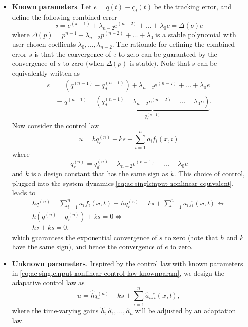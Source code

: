\documentclass[
]{book}
\theoremstyle{definition}
\theoremstyle{definition}
\theoremstyle{definition}
\theoremstyle{definition}
\theoremstyle{remark}
\begin{document}
\begin{itemize}
\item
  \textbf{Known parameters}. Let \(e = q(t) - q_d(t)\) be the tracking error, and define the following combined error
  \[
  s = e^{(n-1)} + \lambda_{n-2} e^{(n-2)} + \dots + \lambda_0 e = \Delta(p) e 
  \]
  where \(\Delta(p) = p^{n-1} + \lambda_{n-2} p^{(n-2)} + \dots + \lambda_0\) is a stable polynomial with user-chosen coeffients \(\lambda_0,\dots,\lambda_{n-2}\). The rationale for defining the combined error \(s\) is that the convergence of \(e\) to zero can be guaranteed by the convergence of \(s\) to zero (when \(\Delta(p)\) is stable).
  Note that \(s\) can be equivalently written as
  \begin{align}
  s & = (q^{(n-1)} - q_d^{(n-1)}) + \lambda_{n-2} e^{(n-2)} + \dots + \lambda_0 e \\
  & = q^{(n-1)} - \underbrace{ \left( q_d^{(n-1)} - \lambda_{n-2} e^{(n-2)} - \dots - \lambda_0 e  \right) }_{q_r^{(n-1)}}.
  \end{align}
  Now consider the control law
  \begin{equation}
  u = h q_r^{(n)} - ks + \sum_{i=1}^n a_i f_i(x,t)
  \label{eq:ac-singleinput-nonlinear-control-law-knownparam}
  \end{equation}
  where
  \[
  q_r^{(n)} = q_d^{(n)} - \lambda_{n-2} e^{(n-1)} - \dots - \lambda_0 \dot{e}
  \]
  and \(k\) is a design constant that has the same sign as \(h\). This choice of control, plugged into the system dynamics \eqref{eq:ac-singleinput-nonlinear-equivalent}, leads to
  \begin{align}
  h q^{(n)} + \sum_{i=1}^n a_i f_i(x,t) = h q_r^{(n)} - ks + \sum_{i=1}^n a_i f_i(x,t) \Longleftrightarrow \\
  h \left( q^{(n)} - q_r^{(n)} \right) + ks = 0 \Longleftrightarrow \\
  h \dot{s} + ks = 0,
  \end{align}
  which guarantees the exponential convergence of \(s\) to zero (note that \(h\) and \(k\) have the same sign), and hence the convergence of \(e\) to zero.
\item
  \textbf{Unknown parameters}. Inspired by the control law with known parameters in \eqref{eq:ac-singleinput-nonlinear-control-law-knownparam}, we design the adapative control law as
  \begin{equation}
  u = \hat{h} q_r^{(n)} - ks + \sum_{i=1}^n \hat{a}_i f_i(x,t),
  \label{eq:ac-singleinput-nonlinear-control-law-unknownparam}
  \end{equation}
  where the time-varying gains \(\hat{h},\hat{a}_1,\dots,\hat{a}_n\) will be adjusted by an adaptation law.
\end{itemize}
\end{document}
